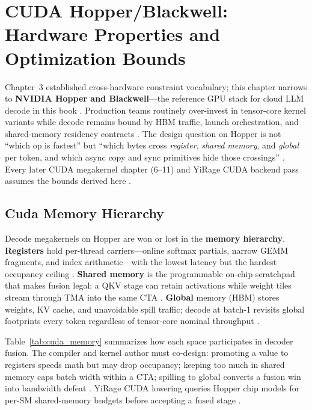 \chapter{CUDA Hopper/Blackwell: Hardware Properties and Optimization Bounds}
\label{chap:ch04}

Chapter~3 established cross-hardware constraint vocabulary; this chapter narrows to \textbf{NVIDIA Hopper and Blackwell}---the reference GPU stack for cloud LLM decode in this book \citep{nvidia2022hopper,semianalysis2024tma}.
Production teams routinely over-invest in tensor-core kernel variants while decode remains bound by HBM traffic, launch orchestration, and shared-memory residency contracts \citep{patel2025llminference,memoryfloor2026,taxbreak2026}.
The design question on Hopper is not ``which op is fastest'' but ``which bytes cross \emph{register}, \emph{shared memory}, and \emph{global} per token, and which async copy and sync primitives hide those crossings'' \citep{nvidia2022hopper,semianalysis2024tma}.
Every later CUDA megakernel chapter (6--11) and YiRage CUDA backend pass assumes the bounds derived here \citep{patel2025llminference}.

\section{Cuda Memory Hierarchy}
\label{sec:cuda_memory_hierarchy}

Decode megakernels on Hopper are won or lost in the \textbf{memory hierarchy}.
\textbf{Registers} hold per-thread carriers---online softmax partials, narrow GEMM fragments, and index arithmetic---with the lowest latency but the hardest occupancy ceiling \citep{nvidia2022hopper,dlbook}.
\textbf{Shared memory} is the programmable on-chip scratchpad that makes fusion legal: a QKV stage can retain activations while weight tiles stream through TMA into the same CTA \citep{nvidia2022hopper,semianalysis2024tma}.
\textbf{Global} memory (HBM) stores weights, KV cache, and unavoidable spill traffic; decode at batch-1 revisits global footprints every token regardless of tensor-core nominal throughput \citep{patel2025llminference,memoryfloor2026}.

Table~\ref{tab:cuda_memory} summarizes how each space participates in decoder fusion.
The compiler and kernel author must co-design: promoting a value to registers speeds math but may drop occupancy; keeping too much in shared memory caps batch width within a CTA; spilling to global converts a fusion win into bandwidth defeat \citep{memoryfloor2026,nvidia2022hopper}.
YiRage CUDA lowering queries Hopper chip models for per-SM shared-memory budgets before accepting a fused stage \citep{patel2025llminference}.

